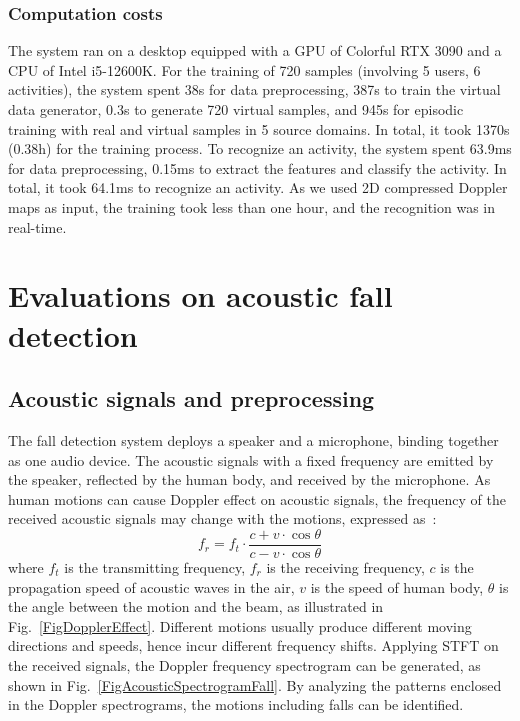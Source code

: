 \documentclass[journal]{IEEEtran}
\begin{document}
\subsubsection{Computation costs}
The system ran on a desktop equipped with a GPU of Colorful RTX 3090 and a CPU of Intel i5-12600K. For the training of 720 samples (involving 5 users, 6 activities), the system spent 38s for data preprocessing, 387s to train the virtual data generator, 0.3s to generate 720 virtual samples, and 945s for episodic training with real and virtual samples in 5 source domains. In total, it took 1370s (0.38h) for the training process. To recognize an activity, the system spent 63.9ms for data preprocessing, 0.15ms to extract the features and classify the activity. In total, it took 64.1ms to recognize an activity. As we used 2D compressed Doppler maps as input, the training took less than one hour, and the recognition was in real-time.

\section{Evaluations on acoustic fall detection}
\label{SecAcoustic}

\subsection{Acoustic signals and preprocessing}
The fall detection system deploys a speaker and a microphone, binding together as one audio device. The acoustic signals with a fixed frequency are emitted by the speaker, reflected by the human body, and received by the microphone. As human motions can cause Doppler effect on acoustic signals, the frequency of the received acoustic signals may change with the motions, expressed as~\cite{LianJ:2021}:
\begin{equation}
f_r = f_t \cdot \frac{c + v\cdot\cos\theta}{c - v\cdot\cos\theta}
\end{equation}
where $f_t$ is the transmitting frequency, $f_r$ is the receiving frequency, $c$ is the propagation speed of acoustic waves in the air, $v$ is the speed of human body, $\theta$ is the angle between the motion and the beam, as illustrated in Fig.~\ref{FigDopplerEffect}. Different motions usually produce different moving directions and speeds, hence incur different frequency shifts. Applying STFT on the received signals, the Doppler frequency spectrogram can be generated, as shown in Fig.~\ref{FigAcousticSpectrogramFall}. By analyzing the patterns enclosed in the Doppler spectrograms, the motions including falls can be identified. 
\end{document}
